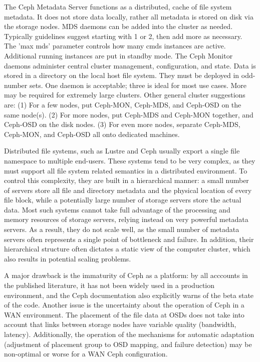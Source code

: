 \documentclass[11pt]{article}
\begin{document}
The Ceph Metadata Server functions as a distributed, cache of file system 
metadata. It does not store data locally, rather all metadata is stored on 
disk via the storage nodes. MDS daemons can be added into the cluster as 
needed. Typically guidelines suggest starting with 1 or 2, then add more 
as necessary. The 'max mds' parameter controls how many cmds instances 
are active. Additional running instances are put in standby mode. The 
Ceph Monitor daemons administer central cluster management, configuration, 
and state. Data is stored in a directory on the local host file system. 
They must be deployed in odd-number sets. One daemon is acceptable; three 
is ideal for most use cases. More may be required for extremely large 
clusters. Other general cluster suggestions are: (1) For a few nodes,  
put Ceph-MON, Ceph-MDS, and Ceph-OSD on the same node(s). (2) For more 
nodes,  put Ceph-MDS and Ceph-MON together, and Ceph-OSD on the disk nodes. 
(3) For even more nodes, separate Ceph-MDS, Ceph-MON, and Ceph-OSD all 
onto dedicated machines.

Distributed file systems, such as  Lustre and Ceph  usually export a 
single file namespace to multiple end-users. These systems tend to be very 
complex, as they must support all file system related semantics in a 
distributed environment. To control this complexity, they are built in a 
hierarchical manner: a small number of servers store all file and directory 
metadata and the physical location of every file block, while a potentially 
large number of storage servers store the actual data. Most such systems 
cannot take full advantage of the processing and memory resources of storage 
servers, relying instead on very powerful metadata servers.  As a result, 
they do not scale well, as the small number of metadata servers often 
represents a single point of bottleneck and failure. In addition, their 
hierarchical structure often dictates a static view of the computer cluster, 
which also results in potential scaling problems. 

A major drawback is the immaturity of Ceph as a platform: by all acccounts 
in the published literature, it has not been widely used in a production 
environment, and the Ceph documentation also explicitly warns of the beta 
state of the code. Another issue is the uncertainty about the operation 
of Ceph in a WAN environment. The placement of the file data at OSDs does 
not take into account that links between storage nodes have variable 
quality (bandwidth, latency). Additionally, the operation of the mechanisms 
for automatic adaptation (adjustment of placement group to OSD mapping, 
and failure detection) may be non-optimal or worse for a WAN Ceph 
configuration.
\end{document}
